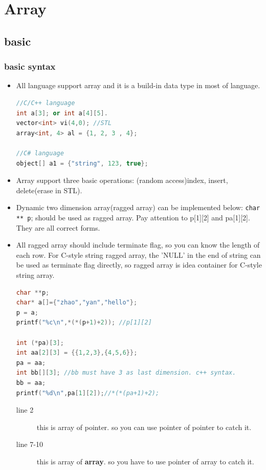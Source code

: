 \documentclass[a4paper,11pt,twoside]{book}
\begin{document}
\section{Array}
\subsection{basic}
\subsubsection{basic syntax}
\begin{itemize}
	\item All language support array and it is a build-in data type in most of language.  
\begin{lstlisting}[frame=single, language=c++]
//C/C++ language
int a[3]; or int a[4][5].  
vector<int> vi(4,0); //STL
array<int, 4> al = {1, 2, 3 , 4};
  
//C# language 
object[] a1 = {"string", 123, true};
\end{lstlisting}

	\item Array support three basic operations: (random access)index, insert, delete(erase in STL).  

	\item Dynamic two dimension array(ragged array) can be implemented below:  \texttt{char ** p}; should be used as ragged array. Pay attention to p[1][2] and pa[1][2]. They are all correct forms.

	\item All ragged array should include terminate flag, so you can know the length of each row.  For C-style string ragged array, the 'NULL' in the end of string can be used as terminate flag directly, so ragged array is idea container for C-style string array. 

\begin{lstlisting}[frame=single, language=c++]
char **p;
char* a[]={"zhao","yan","hello"};
p = a;
printf("%c\n",*(*(p+1)+2)); //p[1][2]

int (*pa)[3];
int aa[2][3] = {{1,2,3},{4,5,6}};
pa = aa;
int bb[][3]; //bb must have 3 as last dimension. c++ syntax.
bb = aa;
printf("%d\n",pa[1][2]);//*(*(pa+1)+2);
\end{lstlisting} 
\begin{description}
	\item[line 2] this is array of pointer. so you can use pointer of pointer to catch it.
	\item[line 7-10] this is array of \textbf{array}. so you have to use pointer of array to catch it.
\end{description}

\end{itemize}
\end{document}
